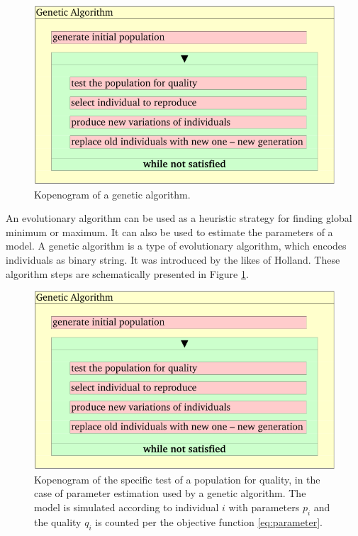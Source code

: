 \begin{figure}[htb]
    \centering
    \includegraphics[page=1]{chapter3/GA-kopenogram-crop.pdf}    
    \caption{Kopenogram of a genetic algorithm. 
    }
    \label{fig:GA-kopenogram}
\end{figure}

An evolutionary algorithm can be used as a heuristic strategy for finding global minimum or maximum. It can also be used to estimate the parameters of a model. A genetic algorithm is a type of evolutionary algorithm, which encodes individuals as binary string. It was introduced by the likes of Holland\cite{Holland1975}. These algorithm steps are schematically presented in Figure \ref{fig:GA-kopenogram}.

\begin{figure}[htb]
    \centering
    \includegraphics[page=2]{chapter3/GA-kopenogram-crop.pdf}    
    \caption{Kopenogram of the specific test of a population for quality, in the case of parameter estimation used by a genetic algorithm. The model is simulated according to individual $i$ with parameters $p_i$ and the quality $q_i$ is counted per the objective function \ref{eq:parameter}.
    }
    \label{fig:GA-kopenogram2}
\end{figure}

